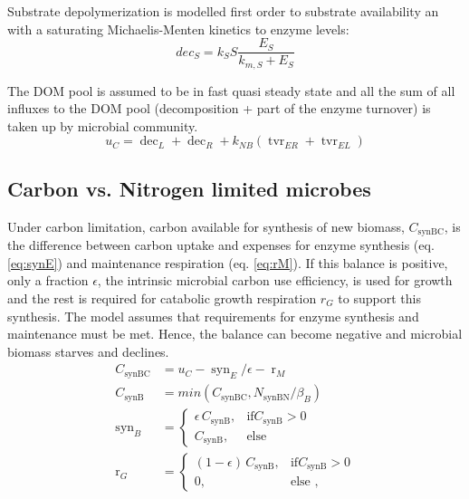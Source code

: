 % 
Substrate depolymerization is modelled first order to substrate
availability an with a saturating Michaelis-Menten kinetics to enzyme levels:
\begin{equation}
\label{eq:dec}
dec_S = k_S S \frac{E_S}{k_{m,S} + E_S} 
\end{equation}
 
The DOM pool is assumed to be in fast quasi steady state and all the sum of all
influxes to the DOM pool (decomposition + part of the enzyme turnover) is taken
up by microbial community.
\begin{equation}
\label{eq:uC}
u_C = \operatorname{dec}_L + \operatorname{dec}_R +  k_{NB}
(\operatorname{tvr}_{ER} + \operatorname{tvr}_{EL})
\end{equation}

\subsection{Carbon vs. Nitrogen limited microbes}
Under carbon limitation, carbon available for synthesis of new biomass,
$C_{\operatorname{synBC}}$, is the difference between carbon uptake and expenses
for enzyme synthesis (eq. \ref{eq:synE}) and maintenance respiration (eq.
\ref{eq:rM}). If this balance is positive, only a fraction $\epsilon$, the
intrinsic microbial carbon use efficiency, is used for growth and the rest is
required for catabolic growth respiration $r_G$ to support this synthesis.
The model assumes that requirements for enzyme synthesis and maintenance must be
met. Hence, the balance can become negative and microbial biomass starves and
declines.
\begin{subequations}
\label{eq:synB}
\begin{align}
\label{eq:synBC} C_{\operatorname{synBC}} &= u_C -
\operatorname{syn}_E/\epsilon - \operatorname{r}_{M} \\
\label{eq:NCLim} C_{\operatorname{synB}} &=
min(C_{\operatorname{synBC}},N_{\operatorname{synBN}}/\beta_B)\\
\operatorname{syn}_B &= \begin{cases}
  \epsilon \, C_{\operatorname{synB}},  & \text{if} C_{\operatorname{synB}} >
  0\\
  C_{\operatorname{synB}}, & \text{else}
\end{cases} \\  
\operatorname{r}_G &= \begin{cases}
  (1 - \epsilon) \, C_{\operatorname{synB}},  & \text{if}
  C_{\operatorname{synB}} > 0\\
  0, & \text{else ,}
\end{cases}  
\end{align}
\end{subequations}

